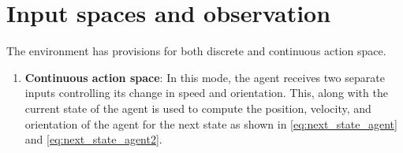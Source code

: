 \section{Input spaces and observation} 
\label{subsec:action-space}
The environment has provisions for both discrete and continuous action space.
\begin{enumerate}
    \item \textbf{Continuous action space}: In this mode, the agent receives two separate inputs controlling its change in speed and orientation. This, along with the current state of the agent is used to compute the position, velocity, and orientation of the agent for the next state as shown in \autoref{eq:next_state_agent} and \autoref{eq:next_state_agent2}.\\
    

\end{enumerate}

